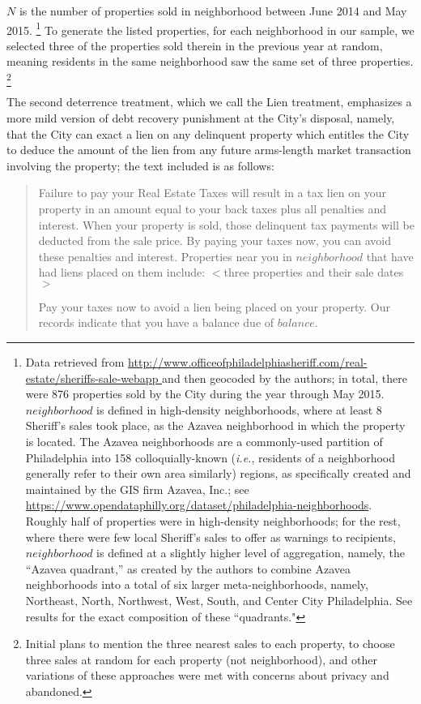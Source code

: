 \documentclass[12pt,titlepage]{article}
\begin{document}
$N$ is the number of properties sold in neighborhood between June 2014
and May 2015.
\footnote{\label{fn:neighborhoods}
	Data retrieved from
	\url{
	http://www.officeofphiladelphiasheriff.com/real-estate/sheriffs-sale-webapp
	}
	and then geocoded by the authors; in total, there were 876 properties 
	sold by the City during the year through May 2015. $neighborhood$ is defined 
	in high-density neighborhoods, where at least 8 Sheriff's sales took place,
	as the Azavea neighborhood in which the property is located. The Azavea 
	neighborhoods are a commonly-used partition of Philadelphia into 158 
	colloquially-known (\textit{i.e.}, residents of a neighborhood generally refer to 
	their own area similarly) regions, as specifically created and maintained 
	by the GIS firm Azavea, Inc.; see 
	\url{https://www.opendataphilly.org/dataset/philadelphia-neighborhoods}. 
	Roughly half of properties were in high-density neighborhoods; for the rest, where 
	there were few local Sheriff's sales to offer as warnings to recipients, 
	$neighborhood$ is defined at a slightly higher level of aggregation, namely, 
	the “Azavea quadrant,” as created by the authors to combine Azavea 
	neighborhoods into a total of six larger meta-neighborhoods, namely, 
	Northeast, North, Northwest, West, South, and Center City Philadelphia. 
	See results for the exact composition of these ``quadrants."
}
To generate the listed properties, for each neighborhood
in our sample, we selected three of the properties sold therein in the
previous year at random, meaning residents in the same neighborhood
saw the same set of three properties.
\footnote{
	Initial plans to mention the three nearest sales to each property, 
	to choose three sales at random for each property (not neighborhood), 
	and other variations of these approaches were met with concerns 
	about privacy and abandoned.
}

The second deterrence treatment, which we call the \hypertarget{lien}{Lien} 
treatment, emphasizes a more mild version of debt recovery punishment at the City's disposal, 
namely, that the City can exact a lien on any delinquent property which 
entitles the City to deduce the amount of the lien from any future arms-length 
market transaction involving the property; the text included is as follows: 

\blockquote{
	Failure to pay your Real Estate Taxes will result in a tax lien on your 
	property in an amount equal to your back taxes plus all penalties and 
	interest. When your property is sold, those delinquent tax payments will 
	be deducted from the sale price. By paying your taxes now, you can avoid 
	these penalties and interest. Properties near you in $neighborhood$ that 
	have had liens placed on them include: 
	$<$three properties and their sale dates$>$ 

	Pay your taxes now to avoid a lien being placed on your property. 
	Our records indicate that you have a balance due of $balance$.
}
\end{document}
